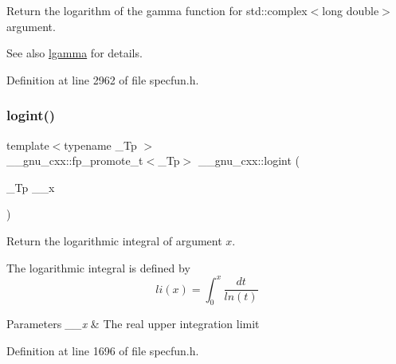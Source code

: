 Return the logarithm of the gamma function for {\ttfamily  std\+::complex$<$long double$>$ } argument.

\begin{DoxySeeAlso}{See also}
\hyperlink{group__gnu__math__spec__func_ga40fa5127f7c419ed1d8f1c6a6f96ea9b}{lgamma} for details. 
\end{DoxySeeAlso}


Definition at line 2962 of file specfun.\+h.

\mbox{\label{group__gnu__math__spec__func_ga1c0fe0f4cb72041f24db82dc7e47df11}} 
\subsubsection{\texorpdfstring{logint()}{logint()}}
{\footnotesize\ttfamily template$<$typename \+\_\+\+Tp $>$ \\
\+\_\+\+\_\+gnu\+\_\+cxx\+::fp\+\_\+promote\+\_\+t$<$\+\_\+\+Tp$>$ \+\_\+\+\_\+gnu\+\_\+cxx\+::logint (\begin{DoxyParamCaption}\item[{\+\_\+\+Tp}]{\+\_\+\+\_\+x }\end{DoxyParamCaption})\hspace{0.3cm}{\ttfamily [inline]}}

Return the logarithmic integral of argument $ x $.

The logarithmic integral is defined by \[ li(x) = \int_0^x \frac{dt}{ln(t)} \]


\begin{DoxyParams}{Parameters}
{\em \+\_\+\+\_\+x} & The real upper integration limit \\
\hline
\end{DoxyParams}


Definition at line 1696 of file specfun.\+h.

\mbox{\label{group__gnu__math__spec__func_gab878da3ba2f5c1d49d96eadde533b233}} 
